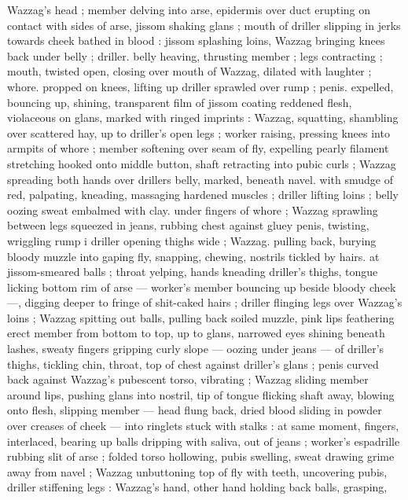 Wazzag's head ; member delving into arse, epidermis over duct 
erupting on contact with sides of arse, jissom shaking glans ; mouth 
of driller slipping in jerks towards cheek bathed in blood : jissom 
splashing loins, Wazzag bringing knees back under belly ; driller. 
belly heaving, thrusting member ; legs contracting ; mouth, twisted 
open, closing over mouth of Wazzag, dilated with laughter ; whore. 
propped on knees, lifting up driller sprawled over rump ; penis. 
expelled, bouncing up, shining, transparent film of jissom coating 
reddened flesh, violaceous on glans, marked with ringed imprints : 
Wazzag, squatting, shambling over scattered hay, up to driller's open 
legs ; worker raising, pressing knees into armpits of whore ; member 
softening over seam of fly, expelling pearly filament stretching 
hooked onto middle button, shaft retracting into pubic curls ; Wazzag 
spreading both hands over drillers belly, marked, beneath navel. 
with smudge of red, palpating, kneading, massaging hardened 
muscles ; driller lifting loins ; belly oozing sweat embalmed with clay. 
under fingers of whore ; Wazzag sprawling between legs squeezed 
in jeans, rubbing chest against gluey penis, twisting, wriggling rump 
i driller opening thighs wide ; Wazzag. pulling back, burying bloody 
muzzle into gaping fly, snapping, chewing, nostrils tickled by hairs. 
at jissom-smeared balls ; throat yelping, hands kneading driller's 
thighs, tongue licking bottom rim of arse --- worker's member 
bouncing up beside bloody cheek ---, digging deeper to fringe of 
shit-caked hairs ; driller flinging legs over Wazzag's loins ; Wazzag 
spitting out balls, pulling back soiled muzzle, pink lips feathering 
erect member from bottom to top, up to glans, narrowed eyes shining 
beneath lashes, sweaty fingers gripping curly slope --- oozing under 
jeans --- of driller's thighs, tickling chin, throat, top of chest against 
driller's glans ; penis curved back against Wazzag's pubescent torso, 
vibrating ; Wazzag sliding member around lips, pushing glans into 
nostril, tip of tongue flicking shaft away, blowing onto flesh, slipping 
member --- head flung back, dried blood sliding in powder over 
creases of cheek --- into ringlets stuck with stalks : at same moment, 
fingers, interlaced, bearing up balls dripping with saliva, out of jeans 
; worker's espadrille rubbing slit of arse ; folded torso hollowing, 
pubis swelling, sweat drawing grime away from navel ; Wazzag 
unbuttoning top of fly with teeth, uncovering pubis, driller stiffening 
legs : Wazzag's hand, other hand holding back balls, grasping, 
